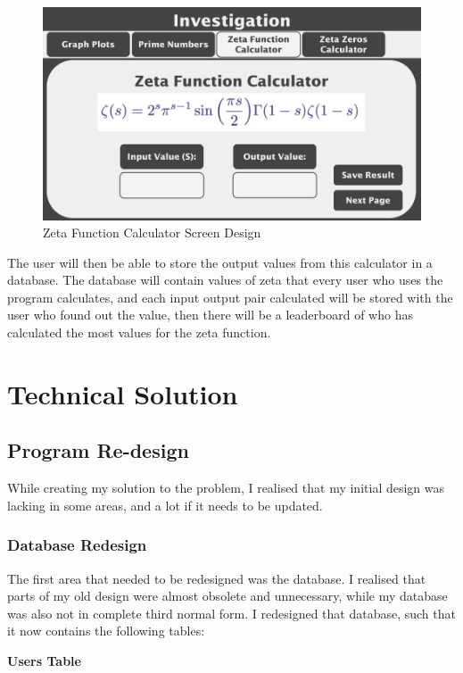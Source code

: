 \documentclass{article}
\begin{document}
\begin{figure}[h]
    \centering
    \includegraphics[scale=0.18]{zeta-function-calculator-screen-design}
    \caption{Zeta Function Calculator Screen Design}
\end{figure}

The user will then be able to store the output values from this calculator in a database. The database will contain values of zeta that every user who uses the program calculates, and each input output pair calculated will be stored with the user who found out the value, then there will be a leaderboard of who has calculated the most values for the zeta function.


\clearpage
\section{Technical Solution}

\subsection{Program Re-design}
While creating my solution to the problem, I realised that my initial design was lacking in some areas, and a lot if it needs to be updated.

\subsubsection{Database Redesign}

The first area that needed to be redesigned was the database. I realised that parts of my old design were almost obsolete and unnecessary, while my database was also not in complete third normal form. I redesigned that database, such that it now contains the following tables:

\textbf{Users Table}
\end{document}
